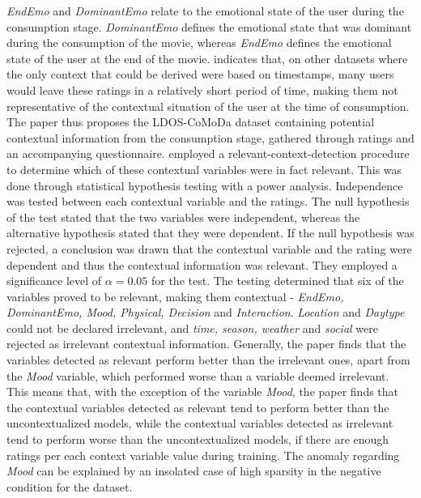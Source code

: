 \textit{EndEmo} and \textit{DominantEmo} relate to the emotional state of the user during the consumption stage.
\textit{DominantEmo} defines the emotional state that was dominant during the consumption of the movie, whereas \textit{EndEmo} defines the emotional state of the user at the end of the movie.
 indicates that, on other datasets where the only context that could be derived were based on timestamps, many users would leave these ratings in a relatively short period of time, making them not representative of the contextual situation of the user at the time of consumption.
The paper thus proposes the LDOS-CoMoDa dataset containing potential contextual information from the consumption stage, gathered through ratings and an accompanying questionnaire.
 employed a relevant-context-detection procedure to determine which of these contextual variables were in fact relevant.
This was done through statistical hypothesis testing with a power analysis.
Independence was tested between each contextual variable and the ratings.
The null hypothesis of the test stated that the two variables were independent, whereas the alternative hypothesis stated that they were dependent.
If the null hypothesis was rejected, a conclusion was drawn that the contextual variable and the rating were dependent and thus the contextual information was relevant.
They employed a significance level of $\alpha = 0.05$ for the test.
The testing determined that six of the variables proved to be relevant, making them contextual - \textit{EndEmo, DominantEmo, Mood, Physical, Decision} and \textit{Interaction}.
\textit{Location} and \textit{Daytype} could not be declared irrelevant, and \textit{time, season, weather} and \textit{social} were rejected as irrelevant contextual information.
Generally, the paper finds that the variables detected as relevant perform better than the irrelevant ones, apart from the \textit{Mood} variable, which performed worse than a variable deemed irrelevant.
This means that, with the exception of the variable \textit{Mood}, the paper finds that the contextual variables detected as relevant tend to perform better than the uncontextualized models, while the contextual variables detected as irrelevant tend to perform worse than the uncontextualized models, if there are enough ratings per each context variable value during training.
The anomaly regarding \textit{Mood} can be explained by an insolated case of high sparsity in the negative condition for the dataset.

